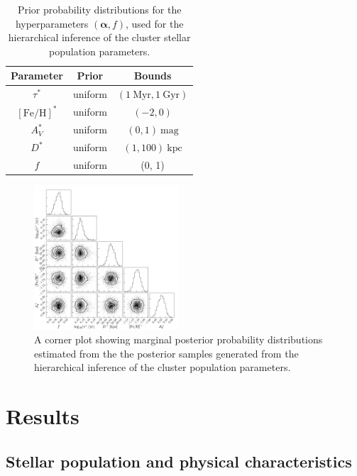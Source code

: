 \documentclass[twocolumn]{aastex62}
\newcommand{\bs}[1]{\boldsymbol{#1}}
\newcommand{\kpc}{\textrm{kpc}}
\newcommand{\feh}{\ensuremath{[\textrm{Fe} / \textrm{H}]}}
\begin{document}
\begin{table}[hbt]
\begin{center}
    \begin{tabular}{ c | c | c }
        \toprule
        Parameter & Prior & Bounds \\
        \toprule
        $\tau^*$ & uniform & $(1~\textrm{Myr}, 1~\textrm{Gyr})$ \\
        $\feh^*$ & uniform & $(-2, 0)$ \\
        $A_V^*$ & uniform & $(0, 1)~\textrm{mag}$ \\
        $D^*$ & uniform & $(1, 100)~\kpc$ \\
        $f$ & uniform & (0, 1) \\
        \toprule
    \end{tabular}
\caption{Prior probability distributions for the hyperparameters $(\bs{\alpha}, f)$, used for the hierarchical inference of the cluster stellar population parameters.
\label{tbl:hyperpriors}}
\end{center}
\end{table}

\begin{figure}
\centering
\includegraphics[width=0.48\textwidth]{figures/hierarch-corner.pdf}
\caption{A corner plot showing marginal posterior probability distributions estimated from the the posterior samples generated from the hierarchical inference of the cluster population parameters.}
\label{fig:hierarch-corner}
\end{figure}


\section{Results} \label{sec:results}

\subsection{Stellar population and physical characteristics}
\label{sec:popchars}
\end{document}
